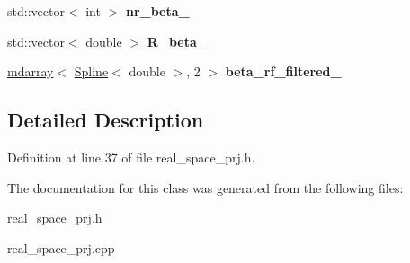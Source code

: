 \begin{DoxyCompactItemize}
\item 
\hypertarget{classsirius_1_1_real__space__prj_aa1fbec2cd9e720c1bbebb2c0b904f4d0}{}std\+::vector$<$ int $>$ {\bfseries nr\+\_\+beta\+\_\+}\label{classsirius_1_1_real__space__prj_aa1fbec2cd9e720c1bbebb2c0b904f4d0}

\item 
\hypertarget{classsirius_1_1_real__space__prj_ae72940f69bc76093176fefbb90989576}{}std\+::vector$<$ double $>$ {\bfseries R\+\_\+beta\+\_\+}\label{classsirius_1_1_real__space__prj_ae72940f69bc76093176fefbb90989576}

\item 
\hypertarget{classsirius_1_1_real__space__prj_aa9780e3f8b8fdd6fbf28bfb54cb5afdc}{}\hyperlink{classsddk_1_1mdarray}{mdarray}$<$ \hyperlink{classsirius_1_1_spline}{Spline}$<$ double $>$, 2 $>$ {\bfseries beta\+\_\+rf\+\_\+filtered\+\_\+}\label{classsirius_1_1_real__space__prj_aa9780e3f8b8fdd6fbf28bfb54cb5afdc}

\end{DoxyCompactItemize}


\subsection{Detailed Description}


Definition at line 37 of file real\+\_\+space\+\_\+prj.\+h.



The documentation for this class was generated from the following files\+:\begin{DoxyCompactItemize}
\item 
real\+\_\+space\+\_\+prj.\+h\item 
real\+\_\+space\+\_\+prj.\+cpp\end{DoxyCompactItemize}
